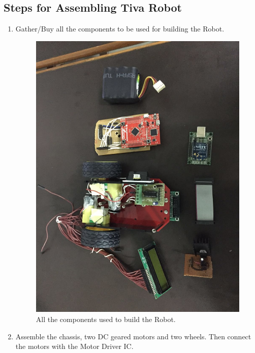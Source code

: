 \documentclass[a4paper,12pt,oneside]{book}
\begin{document}
\subsection{Steps for Assembling Tiva Robot}
\begin{enumerate}
\item Gather/Buy all the components to be used for building the Robot.
\begin{figure}[h]
        \centering
        \includegraphics[scale=0.16]{all_components}
        \caption{All the components used to build the Robot.}
      \end{figure}
\item Assemble the chassis, two DC geared motors and two wheels. Then connect the motors with the Motor Driver IC.
\begin{figure}[h]
        \centering

\end{figure}
\end{enumerate}
\end{document}
